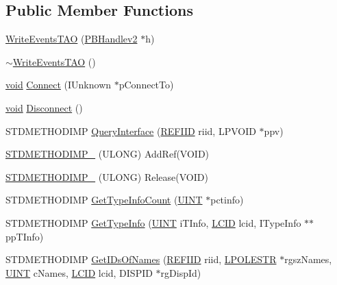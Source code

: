 \subsection*{Public Member Functions}
\begin{DoxyCompactItemize}
\item 
\hyperlink{class_write_events_t_a_o_ac456a26b941ecd63d0606ff9f7edd3ca}{Write\+Events\+T\+AO} (\hyperlink{struct_p_b_handlev2}{P\+B\+Handlev2} $\ast$h)
\item 
\hyperlink{class_write_events_t_a_o_a9766392075f76a04be597f8ed80a6dc2}{$\sim$\+Write\+Events\+T\+AO} ()
\item 
\hyperlink{sound_8c_ae35f5844602719cf66324f4de2a658b3}{void} \hyperlink{class_write_events_t_a_o_a7fe69bb295b675d5d5e48a9f481f2572}{Connect} (I\+Unknown $\ast$p\+Connect\+To)
\item 
\hyperlink{sound_8c_ae35f5844602719cf66324f4de2a658b3}{void} \hyperlink{class_write_events_t_a_o_a71967ac693b4b399e438136fae78d5d6}{Disconnect} ()
\item 
S\+T\+D\+M\+E\+T\+H\+O\+D\+I\+MP \hyperlink{class_write_events_t_a_o_ab559d76b994aaa30303ce9cad318fbc3}{Query\+Interface} (\hyperlink{px__win__ds_8c_a80ec49c8ae61e234197d5071d2df497d}{R\+E\+F\+I\+ID} riid, L\+P\+V\+O\+ID $\ast$ppv)
\item 
\hyperlink{class_write_events_t_a_o_a7348cce472633a0b12455ed457588fc2}{S\+T\+D\+M\+E\+T\+H\+O\+D\+I\+M\+P\+\_\+} (U\+L\+O\+NG) Add\+Ref(V\+O\+ID)
\item 
\hyperlink{class_write_events_t_a_o_a3899b793f9464c8dfa6e8b3e148f6a24}{S\+T\+D\+M\+E\+T\+H\+O\+D\+I\+M\+P\+\_\+} (U\+L\+O\+NG) Release(V\+O\+ID)
\item 
S\+T\+D\+M\+E\+T\+H\+O\+D\+I\+MP \hyperlink{class_write_events_t_a_o_ac3f42df90a3326beae51afaf6dc64a53}{Get\+Type\+Info\+Count} (\hyperlink{mapinls_8h_a36cb3b01d81ffd844bbbfb54003e06ec}{U\+I\+NT} $\ast$pctinfo)
\item 
S\+T\+D\+M\+E\+T\+H\+O\+D\+I\+MP \hyperlink{class_write_events_t_a_o_abe1ebdcf87e4e052928865c03ff0320d}{Get\+Type\+Info} (\hyperlink{mapinls_8h_a36cb3b01d81ffd844bbbfb54003e06ec}{U\+I\+NT} i\+T\+Info, \hyperlink{mapinls_8h_aad243bba501745d51f6a670ade640986}{L\+C\+ID} lcid, I\+Type\+Info $\ast$$\ast$pp\+T\+Info)
\item 
S\+T\+D\+M\+E\+T\+H\+O\+D\+I\+MP \hyperlink{class_write_events_t_a_o_a23ebf25c501c90bd43a36540d9a5e2eb}{Get\+I\+Ds\+Of\+Names} (\hyperlink{px__win__ds_8c_a80ec49c8ae61e234197d5071d2df497d}{R\+E\+F\+I\+ID} riid, \hyperlink{mapinls_8h_a7bf421fbb1651000d29827aa4e1a1d7f}{L\+P\+O\+L\+E\+S\+TR} $\ast$rgsz\+Names, \hyperlink{mapinls_8h_a36cb3b01d81ffd844bbbfb54003e06ec}{U\+I\+NT} c\+Names, \hyperlink{mapinls_8h_aad243bba501745d51f6a670ade640986}{L\+C\+ID} lcid, D\+I\+S\+P\+ID $\ast$rg\+Disp\+Id)
$$
\end{DoxyCompactItemize}
